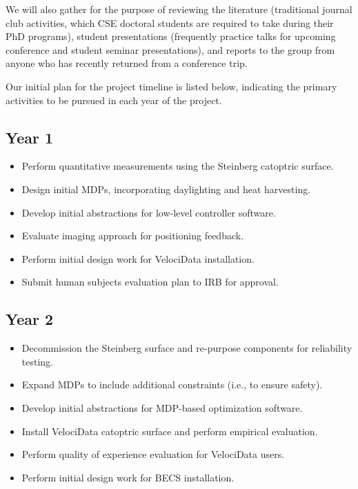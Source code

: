 We will also gather for the purpose of reviewing the literature
(traditional journal club activities, which CSE doctoral students
are required to take during their PhD programs), student 
presentations (frequently practice talks for upcoming conference 
and student seminar presentations), and reports to the group from 
anyone who has recently returned from a conference trip.

Our initial plan for the project timeline is listed below, indicating the
primary activities to be pursued in each year of the project.

\subsection*{Year 1}

\begin{itemize}

\item Perform quantitative measurements using the Steinberg catoptric surface.

\item Design initial MDPs, incorporating daylighting and heat harvesting.

\item Develop initial abstractions for low-level controller software.

\item Evaluate imaging approach for positioning feedback.

\item Perform initial design work for VelociData installation.

\item Submit human subjects evaluation plan to IRB for approval.

\end{itemize}

\subsection*{Year 2}

\begin{itemize}

\item Decommission the Steinberg surface and re-purpose components for
reliability testing.

\item Expand MDPs to include additional constraints (i.e., to ensure
safety).

\item Develop initial abstractions for MDP-based optimization software.

\item Install VelociData catoptric surface and perform empirical evaluation.

\item Perform quality of experience evaluation for VelociData users.

\item Perform initial design work for BECS installation.

\end{itemize}

